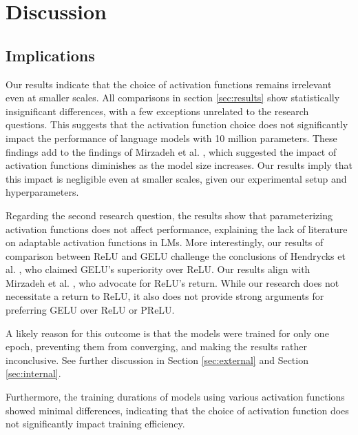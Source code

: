 \section{Discussion} %
\label{sec:discussion}

\subsection{Implications}
Our results indicate that the choice of activation functions remains irrelevant even at smaller scales. All comparisons in section \ref{sec:results} show statistically insignificant differences, with a few exceptions unrelated to the research questions. This suggests that the activation function choice does not significantly impact the performance of language models with 10 million parameters. These findings add to the findings of Mirzadeh et al. \cite{Mirzadeh2023}, which suggested the impact of activation functions diminishes as the model size increases. Our results imply that this impact is negligible even at smaller scales, given our experimental setup and hyperparameters.

Regarding the second research question, the results show that parameterizing activation functions does not affect performance, explaining the lack of literature on adaptable activation functions in LMs. More interestingly, our results of comparison between ReLU and GELU challenge the conclusions of Hendrycks et al. \cite{Hendrycks2023}, who claimed GELU's superiority over ReLU. Our results align with Mirzadeh et al. \cite{Mirzadeh2023}, who advocate for ReLU's return. While our research does not necessitate a return to ReLU, it also does not provide strong arguments for preferring GELU over ReLU or PReLU.

A likely reason for this outcome is that the models were trained for only one epoch, preventing them from converging, and making the results rather inconclusive. See further discussion in Section \ref{sec:external} and Section \ref{sec:internal}.

Furthermore, the training durations of models using various activation functions showed minimal differences, indicating that the choice of activation function does not significantly impact training efficiency.

